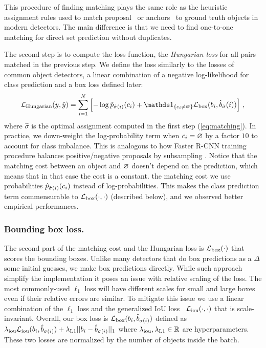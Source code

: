 This procedure of finding matching plays the same role as the heuristic assignment rules used to match proposal~\cite{Ren2015FasterRT} or anchors~\cite{lin2017feature} to ground truth objects in modern detectors. The main difference is that we need to find one-to-one matching for direct set prediction without duplicates.

The second step is to compute the loss function, the \emph{Hungarian loss} for all pairs matched in the previous step. We define the loss similarly to the losses of common object detectors, \ie a linear combination of a negative log-likelihood for class prediction and a box loss defined later:
\begin{equation}
\hloss{y, \hy} = \sum_{i=1}^N \left[-\log  \hp_{\hat{\sigma}(i)}(c_{i}) + \indic{c_i\neq\noobject} \bloss{b_{i}, \hb_{\hat{\sigma}}(i)}\right]\,,
\end{equation}
where $\hat{\sigma}$ is the optimal assignment computed in the first step (\ref{eq:matching}). In practice, we down-weight the log-probability term when $c_i=\noobject$ by a factor $10$ to account for class imbalance. This is analogous to how Faster R-CNN training procedure balances positive/negative proposals by subsampling \cite{Ren2015FasterRT}.
Notice that the matching cost between an object and $\noobject$ doesn't depend
on the prediction, which means that in that case the cost is a constant.
 the matching cost we use probabilities
$\hp_{\hat{\sigma}(i)}(c_{i})$ instead of log-probabilities. This makes the
class prediction term commensurable to $\bloss{\cdot, \cdot}$ (described below),
and we observed better empirical performances. 






\subsubsection{Bounding box loss.} The second part of the matching cost and the Hungarian loss is $\bloss{\cdot}$ that scores the bounding boxes. Unlike many detectors that do box predictions as a $\Delta$ \wrt some initial guesses, we make box predictions directly.
While such approach simplify the implementation it poses an issue  with relative scaling of the loss.
The most commonly-used $\ell_1$ loss will have different scales for small and large boxes even if their relative errors are similar.
To mitigate this issue we use a linear combination of the $\ell_1$ loss and the generalized IoU loss~\cite{Rezatofighi_2018_CVPR} $\iouloss{\cdot, \cdot}$ that is scale-invariant.
Overall, our box loss is $\bloss{b_{i}, \hb_{\sigma(i)}}$ defined as $\lambda_{\rm iou}\iouloss{b_{i}, \hb_{\sigma(i)}} + \lambda_{\rm L1}||b_{i}- \hb_{\sigma(i)}||_1$ where $\lambda_{\rm iou}, \lambda_{\rm L1}\in\Re$ are hyperparameters. 
These two losses are normalized by the number of objects inside the batch.



